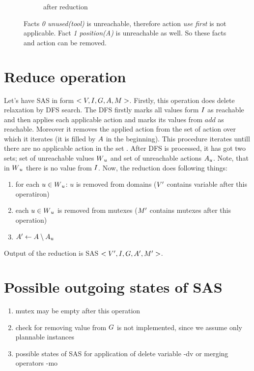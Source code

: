 \begin{figure}
\begin{subfigure}[b]{0.4\textwidth}
			\caption{after reduction}
		\end{subfigure}
		\caption{Facts \emph{0 unused(tool)} is unreachable, therefore action \emph{use first} is not applicable. Fact \emph{1 position(A)} is unreachable as well. So these facts and action can be removed. }
	\end{figure}
	
	\section{Reduce operation}
	Let's have SAS in form $<V, I, G, A, M{}>$.  Firstly, this operation does delete relaxation by DFS search. The DFS firstly marks all values form $I$ as reachable and then applies each applicable action and marks its values from $add$ as reachable. Moreover it removes the applied action from the set of action over which it iterates (it is filled by $A$ in the beginning). This procedure iterates untill there are no applicable action in the set . After DFS is processed, it has got two sets; set of unreachable values $W{}_u$ and set of unreachable actions $A{}_u$. Note, that in $W{}_u$ there is no value from $I$. Now, the reduction does following things:
	
	\begin{enumerate}
		\item for each $u \in W{}_u$: $u$ is removed from domains ($V{}'$ contains variable after this operatiron)
		\item each $u \in  W{}_u$ is removed from mutexes ($M{}'$ contains mutexes after this operation)
		\item $A{}' \leftarrow A \setminus A{}_u$
	\end{enumerate}
	
	Output of the reduction is SAS $<V{}', I{}, G{}, A{}', M{}'>$.
	
	\section{Possible outgoing states of SAS}
	\begin{enumerate}
		\item mutex may be empty after this operation
		\item check for removing value from $G$ is not implemented, since we assume only plannable instances
		\item possible states of SAS for application of delete variable -dv or merging operators -mo
	\end{enumerate}
	
